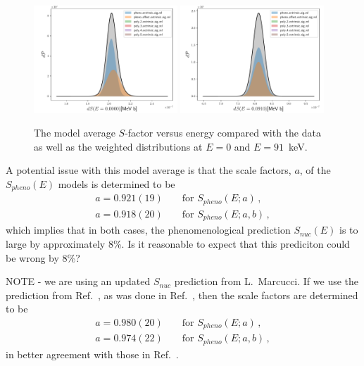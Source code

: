 \documentclass[prd,10pt,superscriptaddress,notitlepage,tightenlines,nofootinbib,floatfix]{revtex4-1}
\begin{document}
\begin{figure}
\includegraphics[width=0.48\textwidth]{figures/S_E0.0000_hist_all}
\includegraphics[width=0.48\textwidth]{figures/S_E0.0910_hist_all}
\caption{\label{fig:all_models}
The model average $S$-factor versus energy compared with the data as well as the weighted distributions at $E=0$ and $E=91$~keV.}
\end{figure}

A potential issue with this model average is that the scale factors, $a$, of the $S_{pheno}(E)$ models is determined to be
\begin{align}
&a = 0.921(19)& &\textrm{ for $S_{pheno}(E; a)$}\, ,&
\nonumber\\
&a = 0.918(20)& &\textrm{ for $S_{pheno}(E; a,b)$}\, ,&
\end{align}
which implies that in both cases, the phenomenological prediction $S_{nuc}(E)$ is to large by approximately 8\%.
Is it reasonable to expect that this prediciton could be wrong by 8\%?

NOTE - we are using an updated $S_{nuc}$ prediction from L.~Marcucci.
If we use the prediction from Ref.~\cite{Marcucci:2005zc}, as was done in Ref.~\cite{Moscoso:2021xog}, then the scale factors are determined to be
\begin{align}
&a = 0.980(20)& &\textrm{ for $S_{pheno}(E; a)$}\, ,&
\nonumber\\
&a = 0.974(22)& &\textrm{ for $S_{pheno}(E; a,b)$}\, ,&
\end{align}
in better agreement with those in Ref.~\cite{Moscoso:2021xog}.
\end{document}
